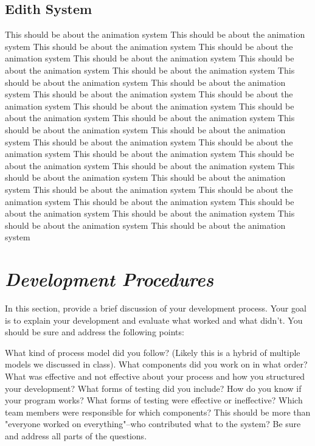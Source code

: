 \documentclass[12pt]{article}
\begin{document}
\subsection{Edith System}
\begin{changemargin}{1cm}{0cm} 
This should be about the animation system This should be about the animation system This should be about the animation system This should be about the animation system This should be about the animation system This should be about the animation system This should be about the animation system This should be about the animation system This should be about the animation system This should be about the animation system This should be about the animation system This should be about the animation system This should be about the animation system This should be about the animation system This should be about the animation system This should be about the animation system This should be about the animation system This should be about the animation system This should be about the animation system This should be about the animation system This should be about the animation system This should be about the animation system This should be about the animation system This should be about the animation system This should be about the animation system This should be about the animation system This should be about the animation system This should be about the animation system This should be about the animation system This should be about the animation system
\end{changemargin} 

\section{\emph{Development Procedures}}
In this section, provide a brief discussion of your development process. Your goal is to explain your development and evaluate what worked and what didn't. You should be sure and address the following points:

What kind of process model did you follow? (Likely this is a hybrid of multiple models we discussed in class). What components did you work on in what order? What was effective and not effective about your process and how you structured your development?
What forms of testing did you include? How do you know if your program works? What forms of testing were effective or ineffective?
Which team members were responsible for which components? This should be more than "everyone worked on everything"--who contributed what to the system?
Be sure and address all parts of the questions.
\end{document}
